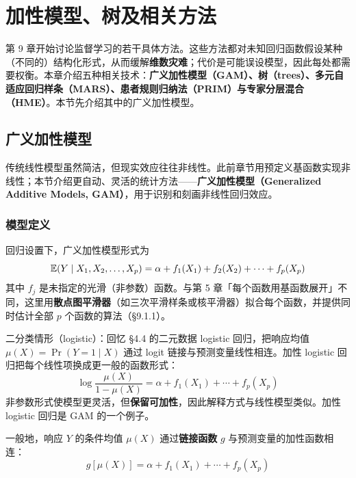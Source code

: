 \chapter{加性模型、树及相关方法}

第 9 章开始讨论监督学习的若干具体方法。这些方法都对未知回归函数假设某种（不同的）结构化形式，从而缓解\textbf{维数灾难}；代价是可能误设模型，因此每处都需要权衡。本章介绍五种相关技术：\textbf{广义加性模型（GAM）、树（trees）、多元自适应回归样条（MARS）、患者规则归纳法（PRIM）与专家分层混合（HME）}。本节先介绍其中的广义加性模型。

\section{广义加性模型}

传统线性模型虽然简洁，但现实效应往往非线性。此前章节用预定义基函数实现非线性；本节介绍更自动、灵活的统计方法——\textbf{广义加性模型（Generalized Additive Models, GAM）}，用于识别和刻画非线性回归效应。

\subsection{模型定义}

回归设置下，广义加性模型形式为
\begin{equation}\label{eq:9_1}
    \mathbb{E}(Y \mid X_1, X_2, \ldots, X_p) = \alpha + f_1(X_1) + f_2(X_2) + \cdots + f_p(X_p)
\end{equation}
其中 $f_j$ 是未指定的光滑（非参数）函数。与第 5 章「每个函数用基函数展开」不同，这里用\textbf{散点图平滑器}（如三次平滑样条或核平滑器）拟合每个函数，并提供同时估计全部 $p$ 个函数的算法（§9.1.1）。

二分类情形（logistic）：回忆 §4.4 的二元数据 logistic 回归，把响应均值 $\mu(X) = \Pr(Y=1 \mid X)$ 通过 logit 链接与预测变量线性相连。加性 logistic 回归把每个线性项换成更一般的函数形式：
\begin{equation}\label{eq:9_3}
    \log\frac{\mu(X)}{1-\mu(X)} = \alpha + f_1(X_1) + \cdots + f_p(X_p)
\end{equation}
非参数形式使模型更灵活，但\textbf{保留可加性}，因此解释方式与线性模型类似。加性 logistic 回归是 GAM 的一个例子。

一般地，响应 $Y$ 的条件均值 $\mu(X)$ 通过\textbf{链接函数} $g$ 与预测变量的加性函数相连：
\begin{equation}\label{eq:9_4}
    g[\mu(X)] = \alpha + f_1(X_1) + \cdots + f_p(X_p)
\end{equation}

